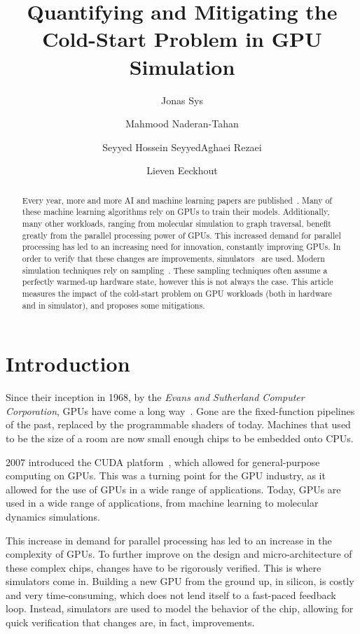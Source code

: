\documentclass[5p,numvwe]{elsarticle}
\title{Quantifying and Mitigating the Cold-Start Problem in GPU Simulation}
\author{Jonas Sys \fnref{fn1}}
\author{Mahmood Naderan-Tahan \fnref{fn2}}
\author{Seyyed Hossein SeyyedAghaei Rezaei \fnref{fn2}}
\author{Lieven Eeckhout \fnref{fn2}}
\begin{document}
    \begin{abstract}
        Every year, more and more AI and machine learning papers are published~\cite{aiindex}.
        Many of these machine learning algorithms rely on GPUs to train their models.
        Additionally, many other workloads, ranging from molecular simulation to graph traversal, benefit greatly from the parallel processing power of GPUs.
        This increased demand for parallel processing has led to an increasing need for innovation, constantly improving GPUs.
        In order to verify that these changes are improvements, simulators~\cite{accelsim} are used.
        Modern simulation techniques rely on sampling~\cite{pks, sieve}.
        These sampling techniques often assume a perfectly warmed-up hardware state, however this is not always the case.
        This article measures the impact of the cold-start problem on GPU workloads (both in hardware and in simulator), and proposes some mitigations. %
    \end{abstract}

    \maketitle

    \section{Introduction}\label{sec:introduction}
    Since their inception in 1968, by the \textit{Evans and Sutherland Computer Corporation}, GPUs have come a long way~\cite{gpu-evolution}.
    Gone are the fixed-function pipelines of the past, replaced by the programmable shaders of today.
    Machines that used to be the size of a room are now small enough chips to be embedded onto CPUs.

    2007 introduced the CUDA platform~\cite{cuda, cuda-prog}, which allowed for general-purpose computing on GPUs.
    This was a turning point for the GPU industry, as it allowed for the use of GPUs in a wide range of applications.
    Today, GPUs are used in a wide range of applications, from machine learning to molecular dynamics simulations.

    This increase in demand for parallel processing has led to an increase in the complexity of GPUs.
    To further improve on the design and micro-architecture of these complex chips, changes have to be rigorously verified.
    This is where simulators come in.
    Building a new GPU from the ground up, in silicon, is costly and very time-consuming, which does not lend itself to a fast-paced feedback loop.
    Instead, simulators are used to model the behavior of the chip, allowing for quick verification that changes are, in fact, improvements.
\end{document}
